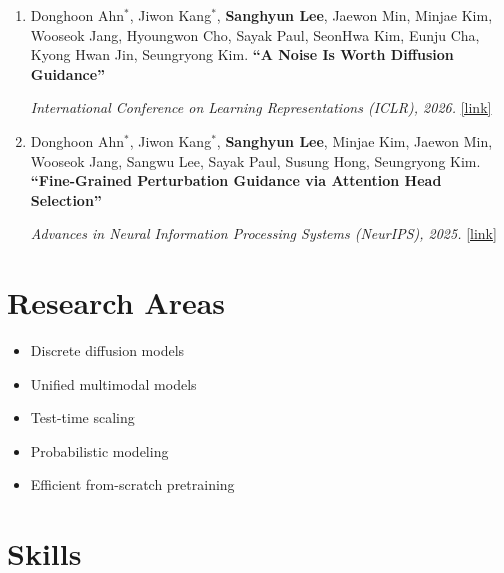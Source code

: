 \documentclass[a4paper,10.5pt]{article}
\begin{document}
\begin{enumerate}
\item Donghoon Ahn$^\ast$, Jiwon Kang$^\ast$, \textbf{Sanghyun Lee}, Jaewon Min, Minjae Kim, Wooseok Jang, Hyoungwon Cho, Sayak Paul, SeonHwa Kim, Eunju Cha, Kyong Hwan Jin, Seungryong Kim.
\textbf{``A Noise Is Worth Diffusion Guidance''}
\begin{flushright}\vspace{-7pt}
\textit{International Conference on Learning Representations (ICLR), 2026.}
\href{https://arxiv.org/pdf/2412.03895}{[link]}
\end{flushright}

\item Donghoon Ahn$^\ast$, Jiwon Kang$^\ast$, \textbf{Sanghyun Lee}, Minjae Kim, Jaewon Min, Wooseok Jang, Sangwu Lee, Sayak Paul, Susung Hong, Seungryong Kim.
\textbf{``Fine-Grained Perturbation Guidance via Attention Head Selection''}
\begin{flushright}\vspace{-7pt}
\textit{Advances in Neural Information Processing Systems (NeurIPS), 2025.}
\href{https://arxiv.org/pdf/2506.10978}{[link]}
\end{flushright}



\end{enumerate}


\section{Research Areas}

\begin{itemize}
    \item Discrete diffusion models
    \item Unified multimodal models
    \item Test-time scaling
    \item Probabilistic modeling
    \item Efficient from-scratch pretraining
\end{itemize}


\section{Skills}
\end{document}
